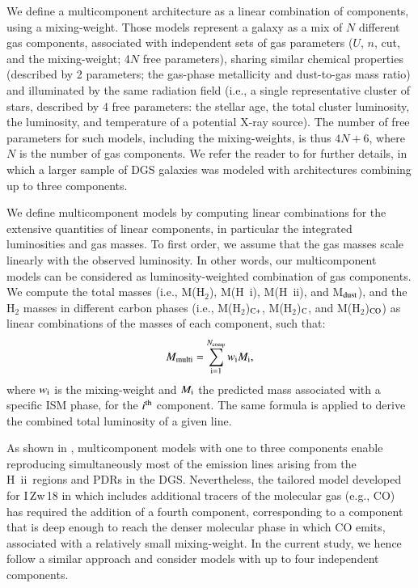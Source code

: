 \documentclass{aa}
\newcommand{\hi}{H~{\sc i}}
\newcommand{\hii}{H~{\sc ii}}
\begin{document}
We define a multicomponent architecture as a linear combination of components, using a mixing-weight. Those models represent a galaxy as a mix of $N$ different gas components, associated with independent sets of gas parameters ($U$, $n$, cut, and the mixing-weight; 4$N$ free parameters), sharing similar chemical properties (described by 2 parameters; the gas-phase metallicity and dust-to-gas mass ratio) and illuminated by the same radiation field (i.e., a single representative cluster of stars, described by 4 free  parameters: the stellar age, the total cluster luminosity, the luminosity, and temperature of a potential X-ray source). The number of free parameters for such models, including the mixing-weights, is thus $4N+6$, where $N$ is the number of gas components. We refer the reader to \cite{Ramambason2022} for further details, in which a larger sample of DGS galaxies was modeled with architectures combining up to three components. 

We define multicomponent models by computing linear combinations for the extensive quantities of linear components, in particular the integrated luminosities and gas masses. To first order, we assume that the gas masses scale linearly with the observed luminosity. In other words, our multicomponent models can be considered as luminosity-weighted combination of gas components. We compute the total masses (i.e., M(H$_2$), M(\hi), M(\hii), and M$_{\rm dust}$), and the H$_2$ masses in different carbon phases (i.e., M(H$_2$)$_{\rm C+}$, M(H$_2$)$_{\rm C}$, and M(H$_2$)$_{\rm CO}$) as linear combinations of the masses of each component, such that:
\begin{equation}
    M_{\rm multi}= \sum_{\rm i=1}^{N_{\rm comp}} w_{\rm i} M_{\rm i},
\end{equation}
where $w_{\rm i}$ is the mixing-weight and $M_{\rm i}$ the predicted mass associated with a specific ISM phase, for the $i^{\rm th}$ component. The same formula is applied to derive the combined total luminosity of a given line.

As shown in \cite{Ramambason2022}, multicomponent models with one to three components enable reproducing simultaneously most of the emission lines arising from the \hii\ regions and PDRs in the DGS. Nevertheless, the tailored model developed for I\,Zw\,18 in \cite{LebouteillerRamambason2022} which includes additional tracers of the molecular gas (e.g., CO) has required the addition of a fourth component, corresponding to a component that is deep enough to reach the denser molecular phase in which CO emits, associated with a relatively small mixing-weight. In the current study, we hence follow a similar approach and consider models with up to four independent components.
\end{document}
